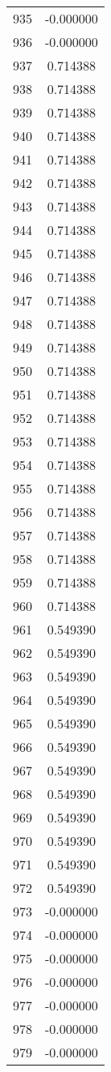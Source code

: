 \documentclass[12pt]{article}
\begin{document}
\begin{longtable}{@{}cc@{}}
935 & -0.000000 \\
936 & -0.000000 \\
937 & 0.714388 \\
938 & 0.714388 \\
939 & 0.714388 \\
940 & 0.714388 \\
941 & 0.714388 \\
942 & 0.714388 \\
943 & 0.714388 \\
944 & 0.714388 \\
945 & 0.714388 \\
946 & 0.714388 \\
947 & 0.714388 \\
948 & 0.714388 \\
949 & 0.714388 \\
950 & 0.714388 \\
951 & 0.714388 \\
952 & 0.714388 \\
953 & 0.714388 \\
954 & 0.714388 \\
955 & 0.714388 \\
956 & 0.714388 \\
957 & 0.714388 \\
958 & 0.714388 \\
959 & 0.714388 \\
960 & 0.714388 \\
961 & 0.549390 \\
962 & 0.549390 \\
963 & 0.549390 \\
964 & 0.549390 \\
965 & 0.549390 \\
966 & 0.549390 \\
967 & 0.549390 \\
968 & 0.549390 \\
969 & 0.549390 \\
970 & 0.549390 \\
971 & 0.549390 \\
972 & 0.549390 \\
973 & -0.000000 \\
974 & -0.000000 \\
975 & -0.000000 \\
976 & -0.000000 \\
977 & -0.000000 \\
978 & -0.000000 \\
979 & -0.000000 \\

\end{longtable}
\end{document}

